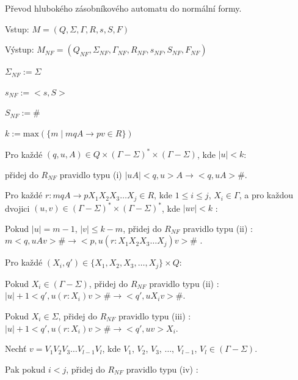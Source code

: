 \begin{Alg}\label{alg_NF}
Převod hlubokého zásobníkového automatu do normální formy.

\begin{list}{}{\setlength\parsep{0cm} \setlength\itemsep{0cm} \setlength\leftmargin{1em}}
   \item Vstup: $M = (Q,\Sigma,\Gamma, R, s, S, F)$ 
   \item Výstup: $M_{NF} = (Q_{NF}, \Sigma_{NF}, {\Gamma}_{NF}, R_{NF}, s_{NF},  S_{NF}, F_{NF})$ \medskip
  
  \item ${\Sigma}_{NF} := \Sigma$
  \item $s_{NF} := <s,S>$
  \item $S_{NF} := \#$ \medskip

  \item $k := \mathrm{max}(\{m \mid mqA \rightarrow pv \in R\}) $ \medskip

  \item Pro každé $(q,u,A) \in Q \times (\Gamma - \Sigma)^* \times (\Gamma - \Sigma)$, kde $|u| < k$: \medskip

  \subitem přidej do $R_{NF}$ pravidlo typu (i) $|uA| <q,u> A \rightarrow <q,uA> \#$. \medskip

  \item Pro každé $r : mqA \rightarrow p X_1 X_2 X_3 \dots X_j \in R$, kde $1 \le i \le j$, $X_i \in \Gamma$, a 
         pro každou dvojici $(u,v) \in (\Gamma - \Sigma)^* \times (\Gamma - \Sigma)^*$, kde $|uv| < k$ : \medskip

  \subitem Pokud $|u| = m - 1$, $|v| \le k-m$, přidej do $R_{NF}$ pravidlo typu (ii) :
  \subitem $m <q,uAv> \# \rightarrow <p,u (r : X_1 X_2 X_3 \dots X_j) v>\#$ . \medskip

  \subitem Pro každé $(X_i,q') \in \{X_1, X_2, X_3, \dots, X_j\} \times Q$: \medskip

  \subsubitem Pokud $X_i \in (\Gamma - \Sigma)$, přidej do $R_{NF}$ pravidlo typu (ii) :
  \subsubitem $|u|+1 <q',u (r : X_i) v> \# \rightarrow <q',u X_i v> \# $. \medskip

  \subsubitem Pokud $X_i \in \Sigma$, přidej do $R_{NF}$ pravidlo typu (iii) :
  \subsubitem $|u|+1 <q',u (r : X_i) v> \# \rightarrow <q',uv> X_i $.\medskip

  \subsubitem Nechť $v = V_1 V_2 V_3 \dots V_{l-1} V_l$, kde $V_1$, $V_2$, $V_3$, $\dots$, $V_{l-1}$, $V_l \in (\Gamma - \Sigma)$.

  \subsubitem Pak pokud $i < j$, přidej do $R_{NF}$ pravidlo typu (iv) :\medskip


\end{list}
\end{Alg}
